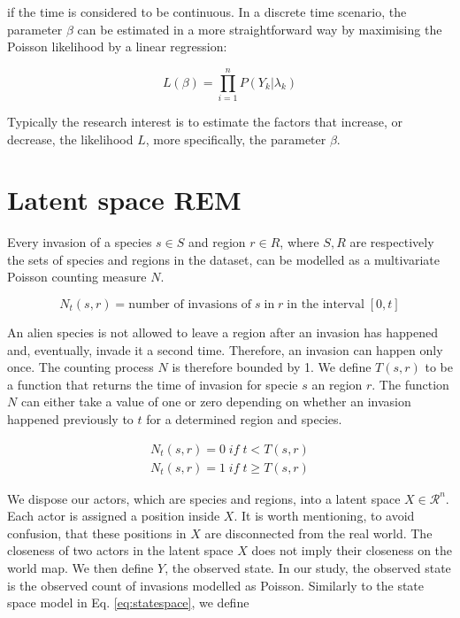 \documentclass[mscthesis]{usiinfthesis}
\begin{document}
\noindent if the time is considered to be continuous. In a discrete time scenario, the parameter $\beta$ can be estimated in a more straightforward way by maximising the Poisson likelihood by a linear regression:

\[
L(\beta) =  \prod_{i=1}^n P(Y_k | \lambda_k)
\]


\noindent Typically the research interest is to estimate the factors that increase, or decrease, the likelihood $L$, more specifically, the parameter $\beta$.


\section{Latent space REM}
 

Every invasion of a species $s \in S$ and region $r \in R$, where $S, R$ are respectively the sets of species and regions in the dataset, can be modelled as a multivariate Poisson counting measure  $N$.

\[
N_t(s, r) = \textrm{number of invasions of} \; s \; \textrm{in} \; r \; \textrm{in the interval} \; [0, t]
\]

\noindent An alien species is not allowed to leave a region after an invasion has happened and, eventually, invade it a second time. Therefore, an invasion can happen only once. The counting process $N$ is therefore bounded by 1. We define $T(s, r)$ to be a function that returns the time of invasion for specie $s$ an region $r$. The function $N$ can either take a value of one or zero depending on whether an invasion happened previously to $t$ for a determined region and species.


\begin{eqfloat}
\begin{equation}
\begin{array}{l}
N_t(s, r) = 0 \; if \; t < T(s, r) \\
N_t(s, r) = 1 \; if \; t \geq T(s, r)
\end{array}
\label{eq:counting process}
\end{equation}
\end{eqfloat}


\noindent We dispose our actors, which are species and regions, into a latent space $X \in \mathcal{R}^n$. Each actor is assigned a position inside $X$. It is worth mentioning, to avoid confusion, that these positions in $X$ are disconnected from the real world. The closeness of two actors in the latent space $X$ does not imply their closeness on the world map. We then define $Y$, the observed state. In our study, the observed state is the observed count of invasions modelled as Poisson. Similarly to the state space model in Eq. \ref{eq:statespace}, we define
\end{document}
